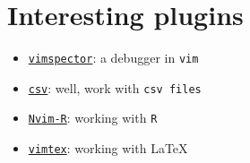 \documentclass[a4paper,12pt,%
              final%
              ]{article}
\newcommand{\vim}{\texttt{vim}}
\begin{document}
\section{Interesting plugins}
\begin{itemize}
  \item \href{https://github.com/puremourning/vimspector}{\texttt{vimspector}}: a
    debugger in \vim{}
  \item \href{https://github.com/chrisbra/csv.vim}{\texttt{csv}}: well, work with \texttt{csv files}
  \item \href{https://github.com/jalvesaq/Nvim-R}{\texttt{Nvim-R}}: working with \texttt{R}
  \item \href{https://github.com/lervag/vimtex}{\texttt{vimtex}}: working with \LaTeX{}
\end{itemize}
%
%
\end{document}
